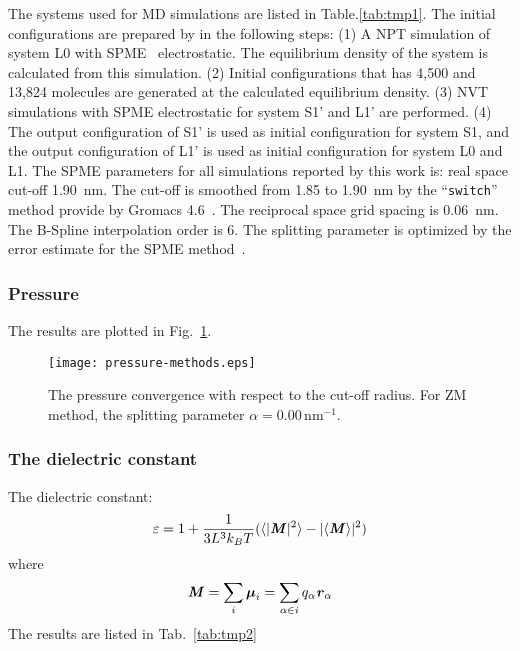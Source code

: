 \documentclass[a4paper,reprint,unsortedaddress,onecolumn]{revtex4-1}
\newcommand{\eps}{\varepsilon}
\newcommand{\vect}[1]{\textbf{\textit{#1}}}
\begin{document}
The systems used for MD simulations are listed in
Table.\ref{tab:tmp1}.  The initial configurations are prepared by in
the following steps: (1) A NPT simulation of system L0 with SPME~\cite{darden1993pme, essmann1995spm}
electrostatic. The equilibrium density of the system is calculated
from this simulation. (2) Initial configurations that has 4,500 and
13,824 molecules are generated at the calculated equilibrium
density. (3) NVT simulations with SPME electrostatic for system S1'
and L1' are performed. (4) The output configuration of S1' is used as
initial configuration for system S1, and the output configuration of
L1' is used as initial configuration for system L0 and L1.  The SPME
parameters for all simulations reported by this work is: real space
cut-off 1.90~nm. The cut-off is smoothed from 1.85 to 1.90~nm by the
``\texttt{switch}'' method provide by Gromacs
4.6~\cite{hess2008gromacs, pronk2013gromacs}. The reciprocal space
grid spacing is 0.06~nm. The B-Spline interpolation order is 6. The
splitting parameter is optimized by the error estimate for the SPME method~\cite{wang2010optimizing}.

\subsubsection{Pressure}
The results are plotted in Fig.~\ref{fig:tmp0}.
\begin{figure}
  \centering
  \texttt{[image: pressure-methods.eps]}
  \caption{The pressure convergence with respect to the cut-off radius.
    For ZM method, the splitting parameter $\alpha = 0.00\,\textrm{nm}^{-1}$.
  }
  \label{fig:tmp0}
\end{figure}


\subsubsection{The dielectric constant}

The dielectric constant:
\begin{align}
  \eps = 1 + \frac{1}{3L^3 k_BT} ( \langle \vert \vect M\vert^2\rangle - \vert\langle \vect M\rangle\vert^2 )
\end{align}
where
\begin{align}
  \vect M = \sum_i\boldsymbol\mu_i = \sum_{\alpha\in i} q_\alpha\vect r_\alpha
\end{align}
The results are listed in Tab.~\ref{tab:tmp2}
\end{document}
